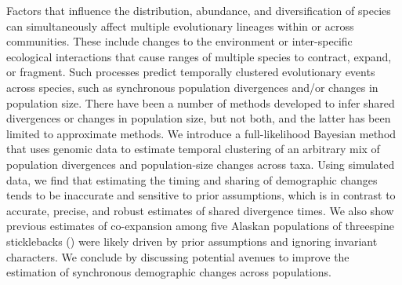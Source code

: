 Factors that influence the distribution, abundance, and diversification of
species can simultaneously affect multiple evolutionary lineages within or
across communities.
These include changes to the environment or inter-specific ecological
interactions that cause ranges of multiple species to contract, expand, or
fragment.
Such processes predict temporally clustered evolutionary events across species,
such as synchronous population divergences and/or changes in population size.
There have been a number of methods developed to infer shared divergences or
changes in population size, but not both, and the latter has been limited to
approximate methods.
We introduce a full-likelihood Bayesian method that uses genomic data to
estimate temporal clustering of an arbitrary mix of population divergences and
population-size changes across taxa.
Using simulated data, we find that estimating the timing and sharing of
demographic changes tends to be inaccurate and sensitive to prior assumptions,
which is in contrast to accurate, precise, and robust estimates of shared
divergence times.
We also show previous estimates of co-expansion among five Alaskan populations
of threespine sticklebacks () were likely driven by
prior assumptions and ignoring invariant characters. 
We conclude by discussing potential avenues to improve the estimation of
synchronous demographic changes across populations.
